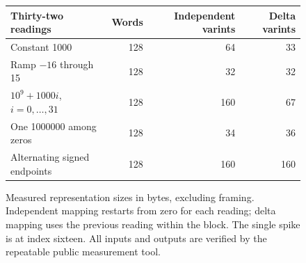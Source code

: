 \begin{figure}[htbp]
  \centering
  \begin{tabular}{l r r r}
    \toprule
    Thirty-two readings           & Words & Independent varints & Delta varints \\
    \midrule
    Constant 1000                 & 128   & 64                  & 33            \\
    Ramp $-16$ through 15         & 128   & 32                  & 32            \\
    $10^9+1000i$, $i=0,\ldots,31$ & 128   & 160                 & 67            \\
    One 1000000 among zeros       & 128   & 34                  & 36            \\
    Alternating signed endpoints  & 128   & 160                 & 160           \\
    \bottomrule
  \end{tabular}
  \caption{Measured representation sizes in bytes, excluding framing. Independent mapping restarts from zero for each reading; delta mapping uses the previous reading within the block. The single spike is at index sixteen. All inputs and outputs are verified by the repeatable public measurement tool.}
  \label{fig:revision-delta-sizes}
\end{figure}
